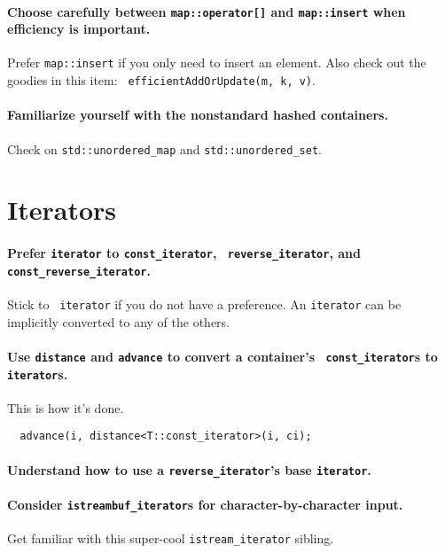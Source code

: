 \documentclass{article}
\begin{document}
\paragraph{Choose carefully between {\tt map::operator[]} and {\tt map::insert}
when efficiency is important.}  Prefer {\tt map::insert} if you only need to
insert an element.  Also check out the goodies in this item: {\tt
efficientAddOrUpdate(m, k, v)}.

\paragraph{Familiarize yourself with the nonstandard hashed containers.}
Check on {\tt std::unordered\_map} and {\tt std::unordered\_set}.

\section{Iterators}

\paragraph{Prefer {\tt iterator} to {\tt const\_iterator}, {\tt
reverse\_iterator}, and\\
{\tt const\_reverse\_iterator}.}  Stick to {\tt
iterator} if you do not have a preference.  An {\tt iterator} can be implicitly
converted to any of the others.

\paragraph{Use {\tt distance} and {\tt advance} to convert a container's {\tt
const\_iterator}s to {\tt iterator}s.}  This is how it's done.
\begin{verbatim}
  advance(i, distance<T::const_iterator>(i, ci);
\end{verbatim}

\paragraph{Understand how to use a {\tt reverse\_iterator}'s base {\tt iterator}.}

\paragraph{Consider {\tt istreambuf\_iterator}s for character-by-character input.}
Get familiar with this super-cool {\tt istream\_iterator} sibling.
\end{document}
